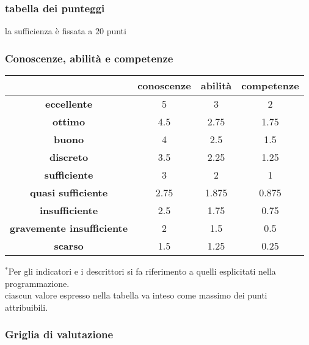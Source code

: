 \documentclass[12pt, a4paper]{exam}
\begin{document}
\vfill
\begin{center}
  \subsubsection*{tabella dei punteggi}
  \combinedgradetable[v][questions]

  \footnotesize{la sufficienza è fissata a $20$ punti}

  \subsubsection*{Conoscenze, abilità e competenze}

  {\selectfont  %
    \footnotesize
    \begin{tabular}{|c|c|c|c|}
      \hline 
    & \textbf{conoscenze} & \textbf{abilità} & \textbf{competenze} \\
    \hline 
      \textbf{eccellente} & 5 & 3 & 2 \\
      \hline 
      \textbf{ottimo} & 4.5 & 2.75 & 1.75 \\
      \hline 
      \textbf{buono} & 4 & 2.5 & 1.5 \\
      \hline 
      \textbf{discreto} & 3.5 & 2.25 & 1.25 \\
      \hline 
      \textbf{sufficiente} & 3 & 2 & 1 \\
      \hline 
      \textbf{quasi sufficiente} & 2.75 & 1.875 & 0.875 \\
      \hline 
      \textbf{insufficiente} & 2.5 & 1.75 & 0.75 \\
      \hline 
      \textbf{gravemente insufficiente} & 2 & 1.5 & 0.5 \\
      \hline 
      \textbf{scarso} & 1.5 & 1.25 & 0.25 \\
      \hline
    \end{tabular}
    \vspace{2pt}

    \footnotesize{$^{*}$Per gli indicatori e i descrittori si fa riferimento a quelli esplicitati nella programmazione.\\ 
    ciascun valore espresso nella tabella va inteso come massimo dei punti attribuibili.}
  }
\end{center}
\noindent

\begin{center}
  \subsubsection*{Griglia di valutazione}
\end{center}
\end{document}
